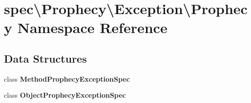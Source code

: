 \section{spec\textbackslash{}Prophecy\textbackslash{}Exception\textbackslash{}Prophecy Namespace Reference}
\label{namespacespec_1_1_prophecy_1_1_exception_1_1_prophecy}
\subsection*{Data Structures}
\begin{DoxyCompactItemize}
\item 
class {\bf Method\+Prophecy\+Exception\+Spec}
\item 
class {\bf Object\+Prophecy\+Exception\+Spec}
\end{DoxyCompactItemize}
